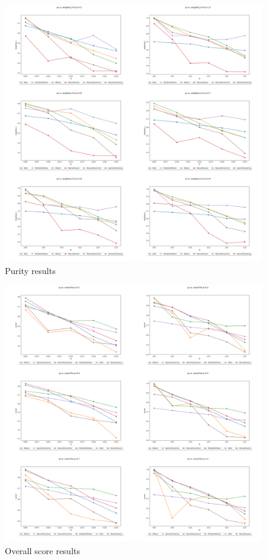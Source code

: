 \documentclass{article}
\begin{document}
\begin{figure}[H]
    \label{fig:results_weighted_ri}
    \centering
    \includegraphics[width=1.15\textwidth]{results/results_weighted_ri.png}
    \caption[Clustering weighted RI (F-score) results]{Purity results}
\end{figure}

\begin{figure}[H]
    \label{fig:results_overall}
    \centering
    \includegraphics[width=1.15\textwidth]{results/results_overall.png}
    \caption[Clustering overall score results]{Overall score results}
\end{figure}
\end{document}
